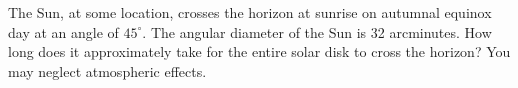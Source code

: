 The Sun, at some location, crosses the horizon at sunrise on autumnal equinox day at an angle of $45^\circ$.
The angular diameter of the Sun is 32 arcminutes. How long does it approximately take for the entire solar
disk to cross the horizon? You may neglect atmospheric effects.
